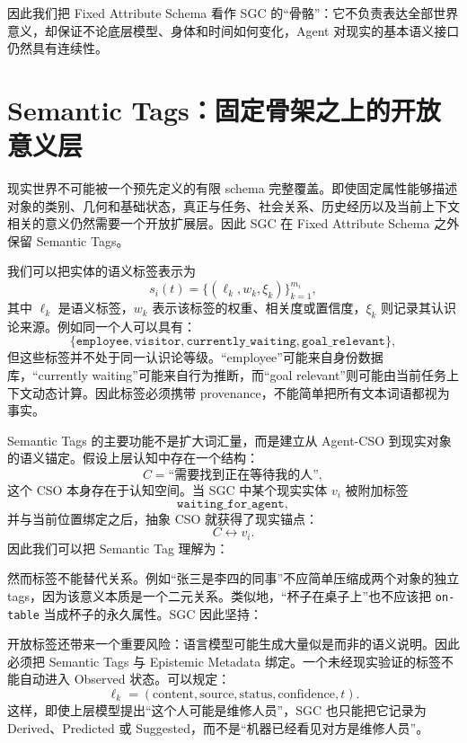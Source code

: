 因此我们把 Fixed Attribute Schema 看作 SGC 的“骨骼”：它不负责表达全部世界意义，却保证不论底层模型、身体和时间如何变化，Agent 对现实的基本语义接口仍然具有连续性。

\section{Semantic Tags：固定骨架之上的开放意义层}

现实世界不可能被一个预先定义的有限 schema 完整覆盖。即使固定属性能够描述对象的类别、几何和基础状态，真正与任务、社会关系、历史经历以及当前上下文相关的意义仍然需要一个开放扩展层。因此 SGC 在 Fixed Attribute Schema 之外保留 Semantic Tags。

我们可以把实体的语义标签表示为
\[
s_i(t)=
\{
(\ell_k,w_k,\xi_k)
\}_{k=1}^{m_i},
\]
其中 $\ell_k$ 是语义标签，$w_k$ 表示该标签的权重、相关度或置信度，$\xi_k$ 则记录其认识论来源。例如同一个人可以具有：
\[
\{
\texttt{employee},
\texttt{visitor},
\texttt{currently\_waiting},
\texttt{goal\_relevant}
\},
\]
但这些标签并不处于同一认识论等级。“employee”可能来自身份数据库，“currently waiting”可能来自行为推断，而“goal relevant”则可能由当前任务上下文动态计算。因此标签必须携带 provenance，不能简单把所有文本词语都视为事实。

Semantic Tags 的主要功能不是扩大词汇量，而是建立从 Agent-CSO 到现实对象的语义锚定。假设上层认知中存在一个结构：
\[
C=
\text{“需要找到正在等待我的人”},
\]
这个 CSO 本身存在于认知空间。当 SGC 中某个现实实体 $v_i$ 被附加标签
\[
\texttt{waiting\_for\_agent},
\]
并与当前位置绑定之后，抽象 CSO 就获得了现实锚点：
\[
C
\longleftrightarrow
v_i.
\]
因此我们可以把 Semantic Tag 理解为：
\begin{statementbox}
\centering
{}
\end{statementbox}

然而标签不能替代关系。例如“张三是李四的同事”不应简单压缩成两个对象的独立 tags，因为该意义本质是一个二元关系。类似地，“杯子在桌子上”也不应该把 \texttt{on-table} 当成杯子的永久属性。SGC 因此坚持：
\begin{statementbox}
\centering
{}
\end{statementbox}

开放标签还带来一个重要风险：语言模型可能生成大量似是而非的语义说明。因此必须把 Semantic Tags 与 Epistemic Metadata 绑定。一个未经现实验证的标签不能自动进入 Observed 状态。可以规定：
\[
\ell_k
=
(\text{content},\text{source},\text{status},\text{confidence},t).
\]
这样，即使上层模型提出“这个人可能是维修人员”，SGC 也只能把它记录为 Derived、Predicted 或 Suggested，而不是“机器已经看见对方是维修人员”。

